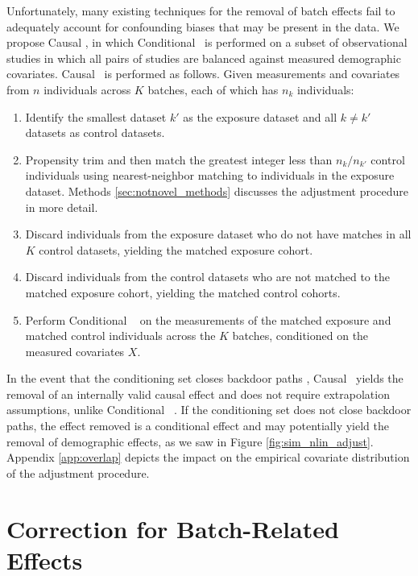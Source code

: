 Unfortunately, many existing techniques for the removal of batch effects fail to adequately account for confounding biases that may be present in the data. We propose Causal \Combat, in which Conditional \Combat\ is performed on a subset of observational studies in which all pairs of studies are balanced against measured demographic covariates.
% 
Causal \Combat\ is performed as follows. Given measurements and covariates from $n$ individuals across $K$ batches, each of which has $n_k$ individuals:
\begin{enumerate}[leftmargin=*]
    \item Identify the smallest dataset $k'$ as the exposure dataset and all $k \neq k'$ datasets as control datasets.
    \item Propensity trim and then match the greatest integer less than $n_k/n_{k'}$ control individuals using nearest-neighbor matching to individuals in the exposure dataset. Methods \ref{sec:notnovel_methods} discusses the adjustment procedure in more detail.
    \item Discard individuals from the exposure dataset who do not have matches in all $K$ control datasets, yielding the matched exposure cohort.
    \item Discard individuals from the control datasets who are not matched to the matched exposure cohort, yielding the matched control cohorts.
    \item Perform Conditional \Combat\ \cite{Johnson2007Jan} on the measurements of the matched exposure and matched control individuals across the $K$ batches, conditioned on the measured covariates $X$.
\end{enumerate}
In the event that the conditioning set closes backdoor paths \cite{Pearl2009Jan,Pearl2010Jul}, Causal \Combat\ yields the removal of an internally valid causal effect and does not require extrapolation assumptions, unlike Conditional \Combat\ \cite{Stuart2010Feb,matchit,Rosenbaum1983Apr,Rosenbaum1985}. If the conditioning set does not close backdoor paths, the effect removed is a conditional effect and may potentially yield the removal of demographic effects, as we saw in Figure \ref{fig:sim_nlin_adjust}. Appendix \ref{app:overlap} depicts the impact on the empirical covariate distribution of the adjustment procedure.



\section{Correction for Batch-Related Effects}

